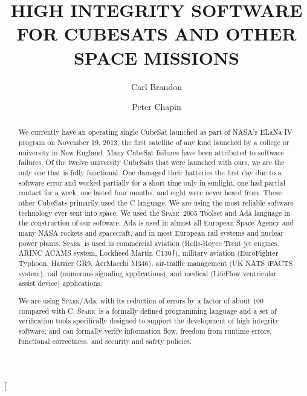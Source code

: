 \documentclass[twocolumn]{article}
\title{HIGH INTEGRITY SOFTWARE FOR CUBESATS AND OTHER SPACE MISSIONS}
\author[*]{Carl Brandon}
\author[**]{Peter Chapin}
\affil[*]{Vermont Technical College, Science Department}
\affil[**]{Vermont Technical College, Computer Information Systems Department}
\date{}
\newcommand{\SPARK}{\textsc{Spark}}   %
\begin{document}
\twocolumn[
  \begin{@twocolumnfalse}
    \maketitle
\begin{abstract}

  We currently have an operating single CubeSat launched as part of NASA's ELaNa IV program on
  November 19, 2013, the first satellite of any kind launched by a college or university in New
  England. Many CubeSat failures have been attributed to software failures. Of the twelve
  university CubeSats that were launched with ours, we are the only one that is fully
  functional. One damaged their batteries the first day due to a software error and worked
  partially for a short time only in sunlight, one had partial contact for a week, one lasted
  four months, and eight were never heard from. These other CubeSats primarily used the C
  language. We are using the most reliable software technology ever sent into space. We used the
  \SPARK\ 2005 Toolset and Ada language in the construction of our software. Ada is used in
  almost all European Space Agency and many NASA rockets and spacecraft, and in most European
  rail systems and nuclear power plants. \SPARK\ is used in commercial aviation (Rolls-Royce
  Trent jet engines, ARINC ACAMS system, Lockheed Martin C130J), military aviation (EuroFighter
  Typhoon, Harrier GR9, AerMacchi M346), air-traffic management (UK NATS iFACTS system), rail
  (numerous signaling applications), and medical (LifeFlow ventricular assist device)
  applications.

  We are using \SPARK/Ada, with its reduction of errors by a factor of about 100 compared with
  C. \SPARK\ is a formally defined programming language and a set of verification tools
  specifically designed to support the development of high integrity software, and can formally
  verify information flow, freedom from runtime errors, functional correctness, and security and
  safety policies.


\end{abstract}
\end{@twocolumnfalse}
\end{document}
